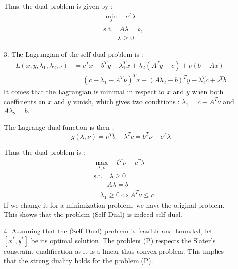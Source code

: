 \documentclass{article}
\begin{document}
\begin{itemize}
        Thus, the dual problem is given by :
        \begin{equation}
            \begin{aligned}
                &\min_{\lambda} \quad c^T\lambda \\
                &\text{s.t.} \quad A\lambda=b, \\
                & \quad \quad \lambda\geq 0
            \end{aligned}
        \end{equation}
        \item[3.] The Lagrangian of the self-dual problem is : 
        \begin{equation}
            \begin{align}
                L(x,y,\lambda_1, \lambda_2, \nu) & =c^Tx-b^Ty-\lambda_1^Tx+\lambda_2(A^Ty-c)+\nu(b-Ax) \\
                & = (c-\lambda_1-A^T\nu)^Tx+(A\lambda_2-b)^Ty-\lambda_2^Tc+\nu^Tb
            \end{align}
        \end{equation}
        It comes that the Lagrangian is minimal in respect to $x$ and $y$ when both coefficients on $x$ and $y$ vanish, which gives two conditions : $\lambda_1 = c-A^T\nu$ and $A\lambda_2=b$.

        The Lagrange dual function is then :
        \begin{equation}
            g(\lambda, \nu)=\nu^Tb-\lambda^Tc=b^T\nu-c^T\lambda
        \end{equation}

        Thus, the dual problem is :
        \begin{equation}
            \begin{aligned}
                &\max_{\lambda, \nu} \quad b^T\nu-c^T\lambda \\
                &\text{s.t.} \quad \lambda\geq0 \\
                & \quad \quad A\lambda=b\\
                & \quad \lambda_1 \geq 0 \Leftrightarrow A^T\nu \leq c
            \end{aligned}
        \end{equation}
        If we change it for a minimization problem, we have the original problem. This shows that the problem (Self-Dual) is indeed self dual.
        \item[4.]  Assuming that the (Self-Dual) problem is feasible and bounded, let $[x^*, y^*]$ be its optimal solution. The problem (P) respects the Slater's constraint qualification as it is a linear thus convex problem. This implies that the strong duality holds for the problem (P).
        

\end{itemize}
\end{document}
